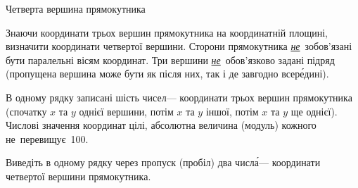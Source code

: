 ﻿\begin{problemAllDefault}{Четверта вершина прямокутника}

Знаючи координати трьох вершин прямокутника на координатній площині, визначити координати четвертої вершини.
Сторони прямокутника \underline{\emph{не}}~зобов'язані бути паралельні вісям координат.
Три вершини \underline{\emph{не}}~обов'язково задані підряд (пропущена вершина може бути як після них, так і де завгодно всер\'{е}дині).

\InputFile
В одному рядку записані шість чисел\nolinebreak[3] --- координати трьох вершин прямокутника
(спочатку $x$ та $y$ однієї вершини, потім $x$ та $y$ іншої, потім $x$ та $y$ ще однієї). 
Числові значення координат цілі, абсолютна величина (модуль) кожного не~перевищує~100.

\OutputFile
Виведіть в одному рядку через пропуск (пробіл) два числ\'{а}\nolinebreak[3] --- координати четвертої вершини прямокутника.

\Examples

\begin{example}
%
%
\end{example}



\end{problemAllDefault}